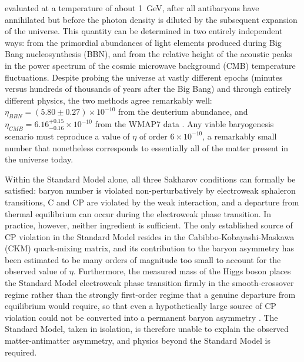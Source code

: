 evaluated at a temperature of about \SI{1}{\giga \eV}, after all antibaryons have annihilated but before the photon density is diluted by the subsequent expansion of the universe. This quantity can be determined in two entirely independent ways: from the primordial abundances of light elements produced during Big Bang nucleosynthesis (BBN), and from the relative height of the acoustic peaks in the power spectrum of the cosmic microwave background (CMB) temperature fluctuations. Despite probing the universe at vastly different epochs (minutes versus hundreds of thousands of years after the Big Bang) and through entirely different physics, the two methods agree remarkably well: $\eta_{BBN} = (5.80 \pm 0.27) \times 10^{-10}$ from the deuterium abundance, and $\eta_{CMB} = 6.16^{+0.15}_{-0.16} \times 10^{-10}$ from the WMAP7 data \cite{Canetti:2012zc}. Any viable baryogenesis scenario must reproduce a value of $\eta$ of order $6 \times 10^{-10}$, a remarkably small number that nonetheless corresponds to essentially all of the matter present in the universe today.

Within the Standard Model alone, all three Sakharov conditions can formally be satisfied: baryon number is violated non-perturbatively by electroweak sphaleron transitions, C and CP are violated by the weak interaction, and a departure from thermal equilibrium can occur during the electroweak phase transition. In practice, however, neither ingredient is sufficient. The only established source of CP violation in the Standard Model resides in the Cabibbo-Kobayashi-Maskawa (CKM) quark-mixing matrix, and its contribution to the baryon asymmetry has been estimated to be many orders of magnitude too small to account for the observed value of $\eta$. Furthermore, the measured mass of the Higgs boson places the Standard Model electroweak phase transition firmly in the smooth-crossover regime rather than the strongly first-order regime that a genuine departure from equilibrium would require, so that even a hypothetically large source of CP violation could not be converted into a permanent baryon asymmetry \cite{Dine_2003}. The Standard Model, taken in isolation, is therefore unable to explain the observed matter-antimatter asymmetry, and physics beyond the Standard Model is required.

